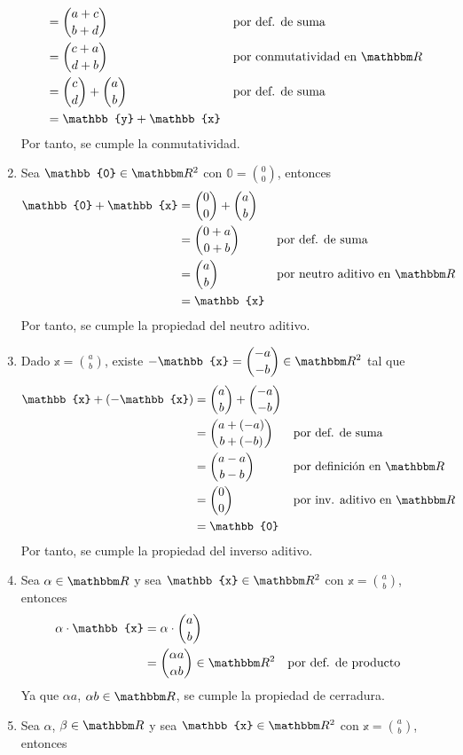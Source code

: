 \begin{example}
\begin{enumerate}[label=\roman*)]
\begin{align*}
            & = \binom{a+c}{b+d} && \text{por def. de suma} \\
            & = \binom{c+a}{d+b} && \text{por conmutatividad en $\RR$} \\
            & = \binom{c}{d} + \binom{a}{b} && \text{por def. de suma} \\
            & = \mathbb{y} + \mathbb{x}
        \end{align*}
        Por tanto, se cumple la conmutatividad.
        \item Sea $\mathbb{0} \in \RR[2]$ con $\displaystyle \mathbb{0} = \binom{0}{0}$, entonces
        \begin{align*}
            \mathbb{0} + \mathbb{x} & = \binom{0}{0} + \binom{a}{b} \\
            & = \binom{0+a}{0+b} && \text{por def. de suma} \\
            & = \binom{a}{b} && \text{por neutro aditivo en $\RR$} \\
            & = \mathbb{x}
        \end{align*}
        Por tanto, se cumple la propiedad del neutro aditivo.
        \item Dado $\displaystyle \mathbb{x} = \binom{a}{b}$, existe $\displaystyle -\mathbb{x} = \binom{-a}{-b} \in \RR[2]$ tal que
        \begin{align*}
            \mathbb{x} + (-\mathbb{x}) & = \binom{a}{b} + \binom{-a}{-b} \\
            & = \binom{a+(-a)}{b+(-b)} && \text{por def. de suma} \\
            & = \binom{a-a}{b-b} && \text{por definición en $\RR$} \\
            & = \binom{0}{0} && \text{por inv. aditivo en $\RR$} \\
            & = \mathbb{0}
        \end{align*}
        Por tanto, se cumple la propiedad del inverso aditivo.
        \item Sea $\alpha \in \RR$ y sea $\mathbb{x} \in \RR[2]$ con $\displaystyle \mathbb{x} = \binom{a}{b}$, entonces
        \begin{align*}
            \alpha \cdot \mathbb{x} & = \alpha \cdot \binom{a}{b} \\
            & = \binom{\alpha a}{\alpha b} \in \RR[2] && \text{por def. de producto}
        \end{align*}
        Ya que $\alpha a$, $\alpha b \in \RR$, se cumple la propiedad de cerradura.
        \item Sea $\alpha$, $\beta \in \RR$ y sea $\mathbb{x} \in \RR[2]$ con $\displaystyle \mathbb{x} = \binom{a}{b}$, entonces

\end{enumerate}
\end{example}
